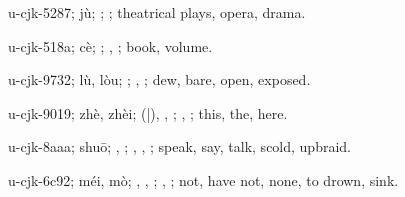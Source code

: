 \begin{multicols}{2}
{\cjkgGlue{}u-cjk-5287; jù; \cjkgGlue{}; \cjkgGlue{}; theatrical plays, opera, drama.

\cjkgGlue{}u-cjk-518a; cè; \cjkgGlue{}; \cjkgGlue{}, \cjkgGlue{}; book, volume.

\cjkgGlue{}u-cjk-9732; lù, lòu; \cjkgGlue{}; \cjkgGlue{}, \cjkgGlue{}; dew, bare, open, exposed.

\cjkgGlue{}u-cjk-9019; zhè, zhèi; \cjkgGlue{}\cjkgGlue{}(\cjkgGlue{}|\cjkgGlue{}), \cjkgGlue{}\cjkgGlue{}\cjkgGlue{}, \cjkgGlue{}; \cjkgGlue{}, \cjkgGlue{}; this, the, here.

\cjkgGlue{}u-cjk-8aaa; shuō; \cjkgGlue{}, \cjkgGlue{}; \cjkgGlue{}, \cjkgGlue{}, \cjkgGlue{}; speak, say, talk, scold, upbraid.

\cjkgGlue{}u-cjk-6c92; méi, mò; \cjkgGlue{}\cjkgGlue{}\cjkgGlue{}, \cjkgGlue{}\cjkgGlue{}\cjkgGlue{}, \cjkgGlue{}; \cjkgGlue{}, \cjkgGlue{}; not, have not, none, to drown, sink.

}
\end{multicols}

